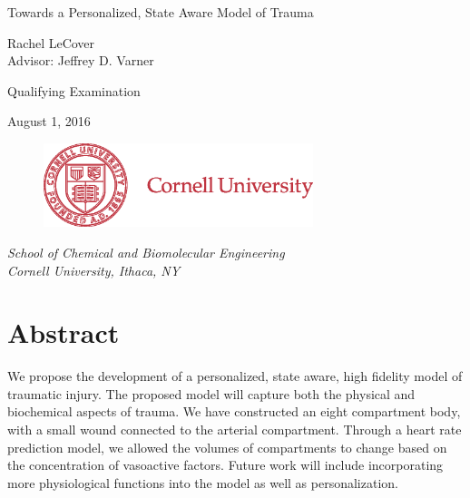 \documentclass[12pt]{article}
\date{}
\begin{document}
\begin{titlepage}
  \begin{center}
    {\LARGE{Towards a Personalized, State Aware Model of Trauma}}\par
    \vspace{5em}
    { \Large{Rachel LeCover} \\
    \vspace{1em}
    { \large{Advisor: Jeffrey D. Varner}}\par   
     \vspace{3em}
    { \large{Qualifying Examination}}\par
     \vspace{1em}
    { \large{August 1, 2016}}\par
    \begin{figure}[h]
    \vspace{3em}
       \centering
       \includegraphics[width=0.7\textwidth]{figures/CULogo187}
       \end{figure}
    \vspace{2em} \large{ \textit{School of Chemical and Biomolecular Engineering \\ \vspace{0.5em} Cornell University, Ithaca, NY}}}\par
    \vspace{3em}
  \end{center}
\end{titlepage}
\pagebreak
\setcounter{page}{1}
\section*{Abstract}
We propose the development of a personalized, state aware, high fidelity model of traumatic injury. The proposed model will capture both the physical and biochemical aspects of trauma. We have constructed an eight compartment body, with a small wound connected to the arterial compartment. Through a heart rate prediction model, we allowed the volumes of compartments to change based on the concentration of vasoactive factors. Future work will include incorporating more physiological functions into the model as well as personalization.
\end{document}
